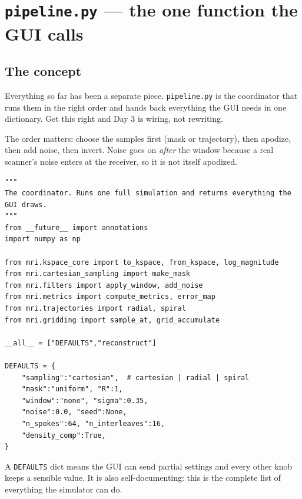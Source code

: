 \documentclass[11pt,a4paper]{article}
\begin{document}
\section{\texttt{pipeline.py} --- the one function the GUI calls}

\subsection{The concept}

Everything so far has been a separate piece. \texttt{pipeline.py} is the
coordinator that runs them in the right order and hands back everything the GUI
needs in one dictionary. Get this right and Day 3 is wiring, not rewriting.

The order matters: choose the samples first (mask or trajectory), then apodize,
then add noise, then invert. Noise goes on \emph{after} the window because a real
scanner's noise enters at the receiver, so it is not itself apodized.

\begin{lstlisting}
"""
The coordinator. Runs one full simulation and returns everything the GUI draws.
"""
from __future__ import annotations
import numpy as np

from mri.kspace_core import to_kspace, from_kspace, log_magnitude
from mri.cartesian_sampling import make_mask
from mri.filters import apply_window, add_noise
from mri.metrics import compute_metrics, error_map
from mri.trajectories import radial, spiral
from mri.gridding import sample_at, grid_accumulate

__all__ = ["DEFAULTS","reconstruct"]

DEFAULTS = {
    "sampling":"cartesian",  # cartesian | radial | spiral
    "mask":"uniform", "R":1,
    "window":"none", "sigma":0.35,
    "noise":0.0, "seed":None,
    "n_spokes":64, "n_interleaves":16,
    "density_comp":True,
}
\end{lstlisting}

A \texttt{DEFAULTS} dict means the GUI can send partial settings and every other
knob keeps a sensible value. It is also self-documenting: this is the complete
list of everything the simulator can do.
\end{document}
